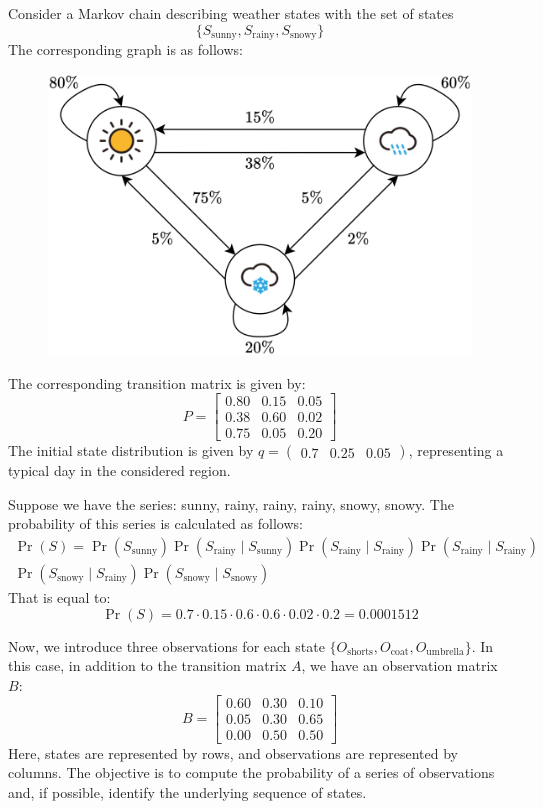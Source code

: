 \begin{example}
    Consider a Markov chain describing weather states with the set of states
    \[\{S_{\text{sunny}},S_{\text{rainy}},S_{\text{snowy}}\}\] 
    The corresponding graph is as follows: 
    \begin{figure}[H]
        \centering
        \includegraphics[width=0.4\linewidth]{images/hmm.png}
    \end{figure}
    The corresponding transition matrix is given by:
    \[P=
    \begin{bmatrix}
        0.80 & 0.15 & 0.05 \\
        0.38 & 0.60 & 0.02 \\
        0.75 & 0.05 & 0.20 
    \end{bmatrix}\]
    The initial state distribution is given by $q=\left(\begin{matrix} 0.7 & 0.25 & 0.05 \end{matrix}\right)$, representing a typical day in the considered region.

    Suppose we have the series: sunny, rainy, rainy, rainy, snowy, snowy. 
    The probability of this series is calculated as follows:
    \begin{multline*}
        \Pr(S) = \Pr (S_{\text{sunny}})  \Pr (S_{\text{rainy}}\mid S_{\text{sunny}})  \Pr (S_{\text{rainy}}\mid S_{\text{rainy}})  \Pr (S_{\text{rainy}}\mid S_{\text{rainy}}) \\ \Pr (S_{\text{snowy}}\mid S_{\text{rainy}})  \Pr (S_{\text{snowy}}\mid S_{\text{snowy}}) 
    \end{multline*}
    That is equal to: 
    \[\Pr(S) = 0.7 \cdot 0.15 \cdot 0.6 \cdot 0.6 \cdot 0.02 \cdot 0.2 = 0.0001512\]

    Now, we introduce three observations for each state $\{O_{\text{shorts}},O_{\text{coat}},O_{\text{umbrella}}\}$. 
    In this case, in addition to the transition matrix $A$, we have an observation matrix $B$: 
    \[B= 
    \begin{bmatrix}
        0.60 & 0.30 & 0.10 \\
        0.05 & 0.30 & 0.65 \\
        0.00 & 0.50 & 0.50 
    \end{bmatrix}\]
    Here, states are represented by rows, and observations are represented by columns. 
    The objective is to compute the probability of a series of observations and, if possible, identify the underlying sequence of states.
\end{example}

